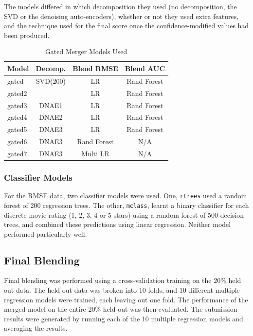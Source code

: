 \documentclass{article}
\begin{document}
The models differed in which decomposition they used (no decomposition, the SVD or the denoising auto-encoders), whether or not they used extra features, and the technique used for the final score once the confidence-modified values had been produced.


\begin{table}
\caption{Gated Merger Models Used}
\label{table:gated-models}
\vskip 0.15in
\begin{center}
\begin{small}
\begin{sc}
\begin{tabular}{lccc}
\hline
\abovespace\belowspace
Model & Decomp. & Blend RMSE & Blend AUC \\
\hline
\abovespace
gated   & SVD(200)  & LR & Rand Forest  \\
gated2  &           & LR & Rand Forest  \\
gated3  & DNAE1     & LR & Rand Forest  \\
gated4  & DNAE2     & LR & Rand Forest  \\
gated5  & DNAE3     & LR & Rand Forest  \\
gated6  & DNAE3     & Rand Forest & N/A  \\
\belowspace
gated7  & DNAE3     & Multi LR & N/A   \\
\hline
\end{tabular}
\end{sc}
\end{small}
\end{center}
\vskip -0.1in
\end{table}

\subsubsection{Classifier Models}

For the RMSE data, two classifier models were used.  One, \texttt{rtrees} used a random forest of 200 regression trees.  The other, \texttt{mclass}, learnt a binary classifier for each discrete movie rating (1, 2, 3, 4 or 5 stars) using a random forest of 500 decision trees, and combined these predictions using linear regression.  Neither model performed particularly well.


\subsection{Final Blending}

Final blending was performed using a cross-validation training on the 20\% held out data.  The held out data was broken into 10 folds, and 10 different multiple regression models were trained, each leaving out one fold.  The performance of the merged model on the entire 20\% held out was then evaluated.  The submission results were generated by running each of the 10 multiple regression models and averaging the results.
\end{document}

